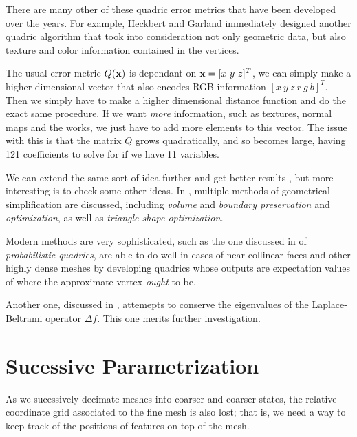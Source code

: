There are many other of these quadric error metrics that have been
developed over the years. For example, Heckbert and Garland
immediately designed another quadric algorithm \cite{LOD2}
that took into consideration not only geometric data, but also
texture and color information contained in the vertices.

\spa

The usual error metric $Q(\bf{x})$ is dependant on
$\bf{x}=[x\ y\ z]^T$, we can simply make a higher dimensional
vector that also encodes RGB information $[x\ y\ z\ r\ g\ b]^T$.
Then we simply have to make a higher dimensional distance function
and do the exact same procedure. If we want \emph{more} information,
such as textures, normal maps and the works, we just have to add more
elements to this vector. The issue with this is that the matrix $Q$
grows quadratically, and so becomes large, having 121 coefficients to
solve for if we have 11 variables.

\spa

We can extend the same sort of idea further and get better results
\cite{LOD3}, but more interesting is to check some other ideas.
In \cite{LOD4}, multiple methods of geometrical simplification
are discussed, including \emph{volume} and \emph{boundary preservation}
and \emph{optimization}, as well as \emph{triangle shape optimization.}

\spa

Modern methods are very sophisticated, such as the one discussed
in \cite{LOD5} of \emph{probabilistic quadrics}, are able to do well
in cases of near collinear faces and other highly dense meshes by
developing quadrics whose outputs are expectation values of where
the approximate vertex \emph{ought} to be.

\spa

Another one, discussed in \cite{LOD6}, attemepts to conserve the 
eigenvalues of the Laplace-Beltrami operator $\Delta f$. This one 
merits further investigation.

\section{Sucessive Parametrization}

As we sucessively decimate meshes into coarser and coarser states,
the relative coordinate grid associated to the fine mesh is also
lost; that is, we need a way to keep track of the positions of
features on top of the mesh.

\spa

